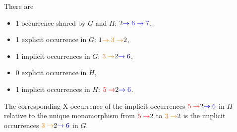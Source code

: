 \begin{example}
\begin{figure}[!htbp]
{
      }
      \caption{}
      \label{fig:subgraph_counting:occurrendfsdadsgces_of_x}
   \end{figure}
   There are 
\begin{itemize}
    \item 1 occurrence shared by $G$ and $H$: $2\textcolor{blue}{ \to 6 \to 7}$,
    \item 1 explicit occurrence in $G$: $1\textcolor{orange}{ \to 3 \to }2$,
    \item 1 implicit occurrences in $G$: 
        $\textcolor{orange}{3 \to }2\textcolor{blue}{ \to 6}$,
    \item 0 explicit occurrence in $H$,
    \item 1 implicit occurrences in $H$: 
        $\textcolor{red}{5 \to }2\textcolor{blue}{ \to 6}$.
\end{itemize}
    The corresponding X-occurrence of the implicit occurrences $\textcolor{red}{5 \to }2\textcolor{blue}{ \to 6}$ in $H$ relative to the unique monomorphism from $\textcolor{red}{5 \to }2$ to $\textcolor{orange}{3 \to }2$ is the implicit occurrences $\textcolor{orange}{3 \to }2\textcolor{blue}{ \to 6}$ in $G$.
\end{example}